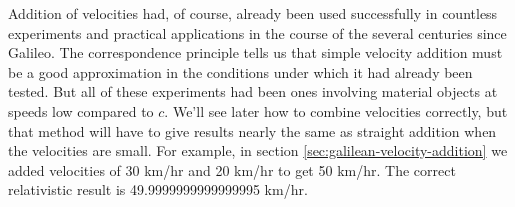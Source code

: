Addition of velocities had, of course, already been used
successfully in countless experiments and practical applications in the course of the several
centuries since Galileo. The correspondence principle tells us that simple velocity addition
must be a good approximation in the conditions under which it had already been tested.
But all of these experiments had been ones involving material objects at speeds low compared
to $c$. We'll see later how to combine velocities correctly, but that method will have to give
results nearly the same as straight addition when the velocities are small. For example,
in section \ref{sec:galilean-velocity-addition} we added velocities of 30 km/hr and 20 km/hr
to get 50 km/hr. The correct relativistic result is 49.9999999999999995 km/hr.
